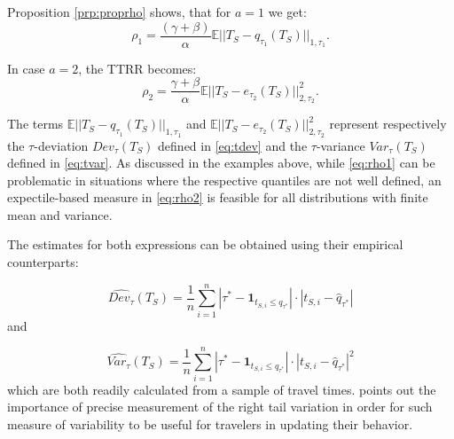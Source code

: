 \documentclass[preprint, 3p, authoryear]{elsarticle} %
\theoremstyle{definition}
\theoremstyle{definition}
\theoremstyle{definition}
\theoremstyle{definition}
\theoremstyle{remark}
\begin{document}
Proposition \ref{prp:proprho} shows, that for \(a=1\) we get:
\begin{equation}\rho_1 = \frac{(\gamma+\beta)}{\alpha}\mathbb E||T_S-q_{\tau_1}(T_S)||_{1,\tau_1}. \label{eq:rho1}
\end{equation}

In case \(a=2\), the TTRR becomes:
\begin{equation}\rho_2=\frac{\gamma+\beta}{\alpha}\mathbb E||T_S-e_{\tau_2}(T_S)||_{2,\tau_2}^2. \label{eq:rho2}
\end{equation}

The terms \(\mathbb E||T_S-q_{\tau_1}(T_S)||_{1,\tau_1}\) and \(\mathbb E||T_S-e_{\tau_2}(T_S)||_{2,\tau_2}^2\) represent respectively the \(\tau\)-deviation \(Dev_\tau(T_S)\) defined in \eqref{eq:tdev} and the \(\tau\)-variance \(Var_\tau(T_S)\) defined in \eqref{eq:tvar}. As discussed in the examples above, while \eqref{eq:rho1} can be problematic in situations where the respective quantiles are not well defined, an expectile-based measure in \eqref{eq:rho2} is feasible for all distributions with finite mean and variance.

The estimates for both expressions can be obtained using their empirical counterparts:

\begin{equation}\widehat{Dev_\tau} (T_S) = \frac 1n\sum_{i=1}^n |\tau^*- \mathbf 1_{t_{S,i}\leq q_{\tau^*}}|\cdot|t_{S,i}-\hat q_{\tau^*}|\label{eq:etdev}
\end{equation}
and

\begin{equation}\widehat{Var_\tau} (T_S) = \frac 1n\sum_{i=1}^n |\tau^*- \mathbf 1_{t_{S,i}\leq q_{\tau^*}}|\cdot |t_{S,i}-\hat q_{\tau^*}|^2\label{eq:etvar}
\end{equation}
which are both readily calculated from a sample of travel times. \citet{taylor2017} points out the importance of precise measurement of the right tail variation in order for such measure of variability to be useful for travelers in updating their behavior.
\end{document}
